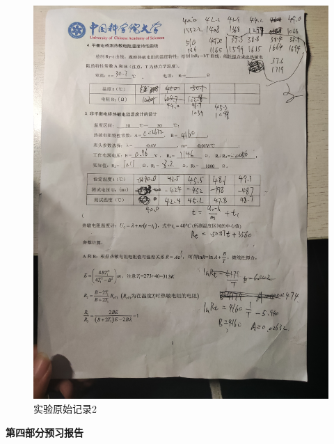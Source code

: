 \documentclass[11pt]{article}
\begin{document}
    \begin{figure}[H]
        \centering
        \includegraphics[width=15cm]{Fig/5.jpg}
        \caption{实验原始记录2}
    \end{figure}
    \begin{center}
        \vspace*{1em}
        \Large \bf 第四部分\qquad 预习报告
    \end{center}
    
\end{document}
